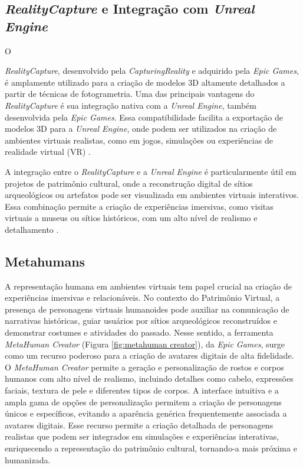 \subsection{\textit{RealityCapture}  e Integração com \textit{Unreal Engine}}
O {\textit{RealityCapture}, desenvolvido pela \textit{CapturingReality} e adquirido pela \textit{Epic Games}, é amplamente utilizado para a criação de modelos 3D altamente detalhados a partir de técnicas de fotogrametria. Uma das principais vantagens do \textit{RealityCapture} é sua integração nativa com a \textit{Unreal Engine}, também desenvolvida pela \textit{Epic Games}. Essa compatibilidade facilita a exportação de modelos 3D para a \textit{Unreal Engine}, onde podem ser utilizados na criação de ambientes virtuais realistas, como em jogos, simulações ou experiências de realidade virtual (VR) \citep{EpicGamesDocs}.

A integração entre o \textit{RealityCapture} e a \textit{Unreal Engine} é particularmente útil em projetos de patrimônio cultural, onde a reconstrução digital de sítios arqueológicos ou artefatos pode ser visualizada em ambientes virtuais interativos. Essa combinação permite a criação de experiências imersivas, como visitas virtuais a museus ou sítios históricos, com um alto nível de realismo e detalhamento \citep{silva2022realidade}.
\subsection{Metahumans}

A representação humana em ambientes virtuais tem papel crucial na criação de experiências imersivas e relacionáveis. No contexto do Patrimônio Virtual, a presença de personagens virtuais humanoides pode auxiliar na comunicação de narrativas históricas, guiar usuários por sítios arqueológicos reconstruídos e demonstrar costumes e atividades do passado. Nesse sentido, a ferramenta \textit{MetaHuman Creator} (Figura \ref{fig:metahuman creator}), da \textit{Epic Games}, surge como um recurso poderoso para a criação de avatares digitais de alta fidelidade.
O \textit{MetaHuman Creator} permite a geração e personalização de rostos e corpos humanos com alto nível de realismo, incluindo detalhes como cabelo, expressões faciais, textura de pele e diferentes tipos de corpos. A interface intuitiva e a ampla gama de opções de personalização permitem a criação de personagens únicos e específicos, evitando a aparência genérica frequentemente associada a avatares digitais. Esse recurso permite a criação detalhada de personagens realistas que podem ser integrados em simulações e experiências interativas, enriquecendo a representação do patrimônio cultural, tornando-a mais próxima e humanizada.

}
